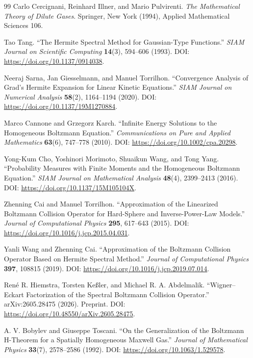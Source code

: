 \documentclass[11pt,oneside]{article}
\numberwithin{equation}{section}
\theoremstyle{definition}
\begin{document}
\begin{thebibliography}{99}
Carlo Cercignani, Reinhard Illner, and Mario Pulvirenti. \emph{The Mathematical Theory of Dilute Gases}. Springer, New York (1994), Applied Mathematical Sciences 106.

Tao Tang. ``The Hermite Spectral Method for Gaussian-Type Functions.'' \emph{SIAM Journal on Scientific Computing} \textbf{14}(3), 594--606 (1993). DOI: \url{https://doi.org/10.1137/0914038}.

Neeraj Sarna, Jan Giesselmann, and Manuel Torrilhon. ``Convergence Analysis of Grad's Hermite Expansion for Linear Kinetic Equations.'' \emph{SIAM Journal on Numerical Analysis} \textbf{58}(2), 1164--1194 (2020). DOI: \url{https://doi.org/10.1137/19M1270884}.

Marco Cannone and Grzegorz Karch. ``Infinite Energy Solutions to the Homogeneous Boltzmann Equation.'' \emph{Communications on Pure and Applied Mathematics} \textbf{63}(6), 747--778 (2010). DOI: \url{https://doi.org/10.1002/cpa.20298}.

Yong-Kum Cho, Yoshinori Morimoto, Shuaikun Wang, and Tong Yang. ``Probability Measures with Finite Moments and the Homogeneous Boltzmann Equation.'' \emph{SIAM Journal on Mathematical Analysis} \textbf{48}(4), 2399--2413 (2016). DOI: \url{https://doi.org/10.1137/15M105104X}.

Zhenning Cai and Manuel Torrilhon. ``Approximation of the Linearized Boltzmann Collision Operator for Hard-Sphere and Inverse-Power-Law Models.'' \emph{Journal of Computational Physics} \textbf{295}, 617--643 (2015). DOI: \url{https://doi.org/10.1016/j.jcp.2015.04.031}.

Yanli Wang and Zhenning Cai. ``Approximation of the Boltzmann Collision Operator Based on Hermite Spectral Method.'' \emph{Journal of Computational Physics} \textbf{397}, 108815 (2019). DOI: \url{https://doi.org/10.1016/j.jcp.2019.07.014}.

Ren{\'e} R. Hiemstra, Torsten Ke{\ss}ler, and Michael R. A. Abdelmalik. ``Wigner--Eckart Factorization of the Spectral Boltzmann Collision Operator.'' arXiv:2605.28475 (2026). Preprint. DOI: \url{https://doi.org/10.48550/arXiv.2605.28475}.

A. V. Bobylev and Giuseppe Toscani. ``On the Generalization of the Boltzmann H-Theorem for a Spatially Homogeneous Maxwell Gas.'' \emph{Journal of Mathematical Physics} \textbf{33}(7), 2578--2586 (1992). DOI: \url{https://doi.org/10.1063/1.529578}.


\end{thebibliography}
\end{document}
